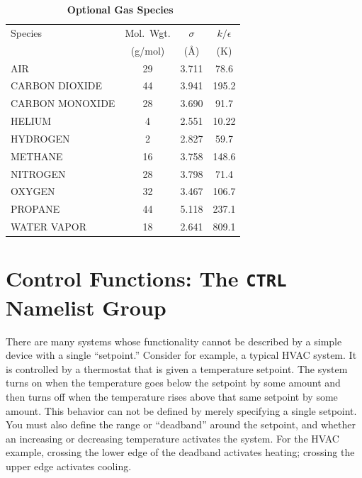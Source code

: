 \documentclass[11pt]{book}
\begin{document}
\begin{table}[t]
\begin{center}
\caption{\bf Optional Gas Species~\cite{Reid:1}}
\label{tab:gasspecies}
\vspace{0.1in}
\begin{tabular}{|l|c|c|c|}
\hline
Species &   Mol.~Wgt.        & $\sigma$  & $k/\epsilon$  \\
        &   (g/mol)          & (\AA)     & (K)            \\ \hline
\hline
{\ct AIR}             & 29   & 3.711     & 78.6           \\ \hline
{\ct CARBON DIOXIDE}  & 44   & 3.941     &195.2           \\ \hline
{\ct CARBON MONOXIDE} & 28   & 3.690     & 91.7           \\ \hline
{\ct HELIUM}          &  4   & 2.551     & 10.22          \\ \hline
{\ct HYDROGEN}        &  2   & 2.827     & 59.7           \\ \hline
{\ct METHANE}         & 16   & 3.758     &148.6           \\ \hline
{\ct NITROGEN}        & 28   & 3.798     & 71.4           \\ \hline
{\ct OXYGEN}          & 32   & 3.467     &106.7           \\ \hline
{\ct PROPANE}         & 44   & 5.118     &237.1           \\ \hline
{\ct WATER VAPOR}     & 18   & 2.641     &809.1           \\ \hline
\end{tabular}
\end{center}
\end{table}



\section{Control Functions: The \texorpdfstring{{\tt CTRL}}{CTRL} Namelist Group}
\label{info:CTRL}

There are many systems whose functionality cannot be described by a simple device with a single ``setpoint.''
Consider for example, a typical HVAC system.  It is controlled by a thermostat that is given a temperature setpoint.
The system turns on when the temperature goes below the setpoint by some amount and then turns off
when the temperature rises above that same setpoint by some amount.  This behavior can not be defined by merely specifying a single setpoint.
You must also define the range or ``deadband'' around the setpoint, and whether an increasing or decreasing temperature
activates the system.  For the HVAC example, crossing
the lower edge of the deadband activates heating; crossing the upper edge activates cooling.
\end{document}
